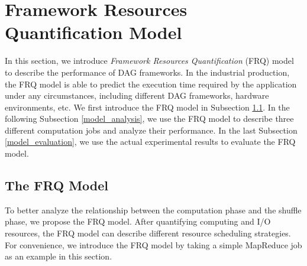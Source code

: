 {\color{black}
\section{Framework Resources Quantification Model}\label{model}

In this section, we introduce \textit{Framework Resources Quantification} (FRQ) model to describe the performance of DAG frameworks.
In the industrial production, the FRQ model is able to predict the execution time required by the application under any circumstances, including different DAG frameworks, hardware environments, etc.
We first introduce the FRQ model in Subsection \ref{model_overview}. In the following Subsection \ref{model_analysis}, we use the FRQ model to describe three different computation jobs and analyze their performance. In the last Subsection \ref{model_evaluation}, we use the actual experimental results to evaluate the FRQ model.

\subsection{The FRQ Model}\label{model_overview}
To better analyze the relationship between the computation phase and the shuffle phase, we propose the FRQ model. After quantifying computing and I/O resources, the FRQ model can describe different resource scheduling strategies. For convenience, we introduce the FRQ model by taking a simple MapReduce job as an example in this section.

}
